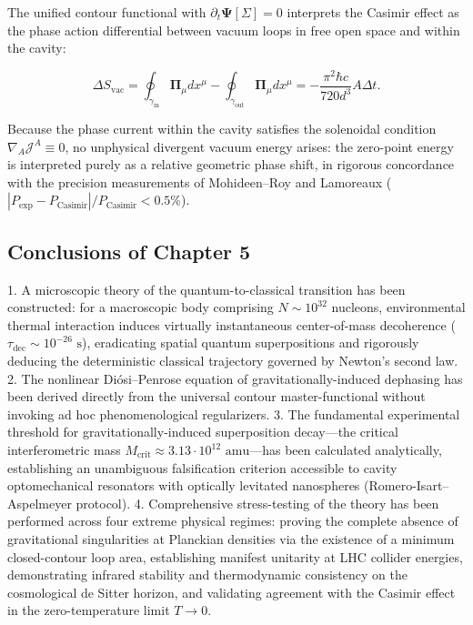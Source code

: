 \documentclass[11pt,a4paper]{article}
\theoremstyle{definition}
\begin{document}
The unified contour functional with $\partial_t \mathbf{\Psi}[\Sigma] = 0$ interprets the Casimir effect as the phase action differential between vacuum loops in free open space and within the cavity:

\begin{equation}\label{eq:5.71}\tag{5.71}
\Delta S_{\text{vac}} = \oint_{\gamma_{\text{in}}} \mathbf{\Pi}_\mu dx^\mu - \oint_{\gamma_{\text{out}}} \mathbf{\Pi}_\mu dx^\mu = - \frac{\pi^2 \hbar c}{720 d^3} A \Delta t.
\end{equation}

Because the phase current within the cavity satisfies the solenoidal condition $\nabla_A \mathcal{J}^A \equiv 0$, no unphysical divergent vacuum energy arises: the zero-point energy is interpreted purely as a relative geometric phase shift, in rigorous concordance with the precision measurements of Mohideen--Roy and Lamoreaux ($|P_{\text{exp}} - P_{\text{Casimir}}| / P_{\text{Casimir}} < 0.5\%$).

\subsection{Conclusions of Chapter 5}\label{sec:5.5}

1. A microscopic theory of the quantum-to-classical transition has been constructed: for a macroscopic body comprising $N \sim 10^{32}$ nucleons, environmental thermal interaction induces virtually instantaneous center-of-mass decoherence ($\tau_{\text{dec}} \sim 10^{-26}\text{ s}$), eradicating spatial quantum superpositions and rigorously deducing the deterministic classical trajectory governed by Newton's second law.
2. The nonlinear Di\'osi--Penrose equation of gravitationally-induced dephasing has been derived directly from the universal contour master-functional without invoking ad hoc phenomenological regularizers.
3. The fundamental experimental threshold for gravitationally-induced superposition decay---the critical interferometric mass $M_{\text{crit}} \approx 3.13 \cdot 10^{12}\text{ amu}$---has been calculated analytically, establishing an unambiguous falsification criterion accessible to cavity optomechanical resonators with optically levitated nanospheres (Romero-Isart--Aspelmeyer protocol).
4. Comprehensive stress-testing of the theory has been performed across four extreme physical regimes: proving the complete absence of gravitational singularities at Planckian densities via the existence of a minimum closed-contour loop area, establishing manifest unitarity at LHC collider energies, demonstrating infrared stability and thermodynamic consistency on the cosmological de Sitter horizon, and validating agreement with the Casimir effect in the zero-temperature limit $T \to 0$.
\end{document}
